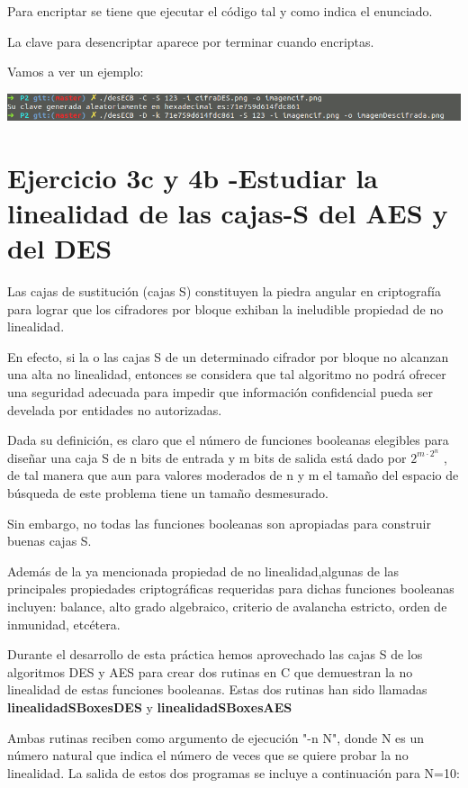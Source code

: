 \documentclass{apuntes}
\begin{document}
Para encriptar se tiene que ejecutar el código tal y como indica el enunciado.

La clave para desencriptar aparece por terminar cuando encriptas.

Vamos a ver un ejemplo:

\begin{center}
		\includegraphics[width=400pt]{EjecutaDES.png}
\end{center}



\section{Ejercicio 3c y 4b -Estudiar la linealidad de las cajas-S del AES y del DES}
Las cajas de sustitución (cajas S) constituyen la piedra angular en criptografía para lograr que los
cifradores por bloque exhiban la ineludible propiedad de no linealidad.

 En efecto, si la o las cajas S
de un determinado cifrador por bloque no alcanzan una alta no linealidad, entonces se considera que
tal algoritmo no podrá ofrecer una seguridad adecuada para impedir que información confidencial
pueda ser develada por entidades no autorizadas.

Dada su definición, es claro que el número de funciones booleanas elegibles para diseñar una caja S de n bits de entrada y m bits de salida está dado por $2^{m\cdot 2^n}$ , de tal manera que aun para valores moderados de n y m el tamaño del espacio de búsqueda de este problema tiene un tamaño desmesurado.

Sin embargo, no todas las funciones booleanas son apropiadas para construir buenas cajas S.

Además de la ya mencionada propiedad de no linealidad,algunas de las principales propiedades criptográficas requeridas para dichas funciones booleanas incluyen: balance, alto grado algebraico, criterio de avalancha estricto, orden de inmunidad, etcétera.

Durante el desarrollo de esta práctica hemos aprovechado las cajas S de los algoritmos DES y AES para crear dos rutinas en C que demuestran la no linealidad de estas funciones booleanas. Estas dos rutinas han sido llamadas \textbf{linealidadSBoxesDES} y \textbf{linealidadSBoxesAES}

 Ambas rutinas reciben como argumento de ejecución "-n N", donde N es un número natural que indica el número de veces
que se quiere probar la no linealidad. La salida de estos dos programas se incluye a continuación para N=10:
\end{document}
